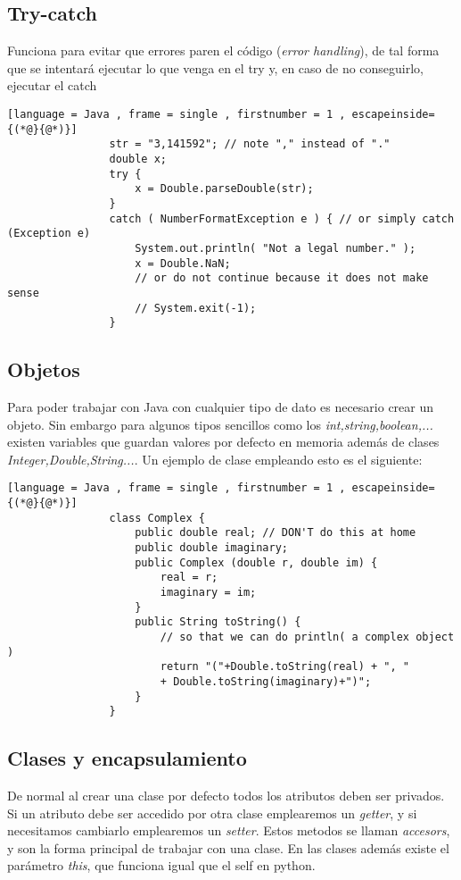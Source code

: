 \documentclass[11pt]{article}
\theoremstyle{plain}
\begin{document}
        \subsection{Try-catch} %
        \label{sub:try_catch}
            Funciona para evitar que errores paren el código (\textit{error handling}), de tal forma que se intentará ejecutar lo que venga en el try y, en caso de no conseguirlo, ejecutar el catch
            \begin{lstlisting}[language = Java , frame = single , firstnumber = 1 , escapeinside={(*@}{@*)}]
                str = "3,141592"; // note "," instead of "."
                double x;
                try {
                    x = Double.parseDouble(str);
                }
                catch ( NumberFormatException e ) { // or simply catch (Exception e)
                    System.out.println( "Not a legal number." );
                    x = Double.NaN;
                    // or do not continue because it does not make sense
                    // System.exit(-1);
                }
            \end{lstlisting}
        \subsection{Objetos} %
        \label{sub:objetos}
            Para poder trabajar con Java con cualquier tipo de dato es necesario crear un objeto. Sin embargo para algunos tipos sencillos como los \textit{int,string,boolean,...} existen variables que guardan valores por defecto en memoria además de clases \textit{Integer,Double,String...}. Un ejemplo de clase empleando esto es el siguiente:
            \begin{lstlisting}[language = Java , frame = single , firstnumber = 1 , escapeinside={(*@}{@*)}]
                class Complex {
                    public double real; // DON'T do this at home
                    public double imaginary;
                    public Complex (double r, double im) {
                        real = r;
                        imaginary = im;
                    }
                    public String toString() {
                        // so that we can do println( a complex object )
                        return "("+Double.toString(real) + ", "
                        + Double.toString(imaginary)+")";
                    }
                }
            \end{lstlisting}
        \subsection{Clases y encapsulamiento} %
        \label{sub:clases_y_encapsulamiento}
            De normal al crear una clase por defecto todos los atributos deben ser privados. Si un atributo debe ser accedido por otra clase emplearemos un \textit{getter}, y si necesitamos cambiarlo emplearemos un \textit{setter}. Estos metodos se llaman \textit{accesors}, y son la forma principal de trabajar con una clase. En las clases además existe el parámetro \textit{this}, que funciona igual que el self en python.
\end{document}
